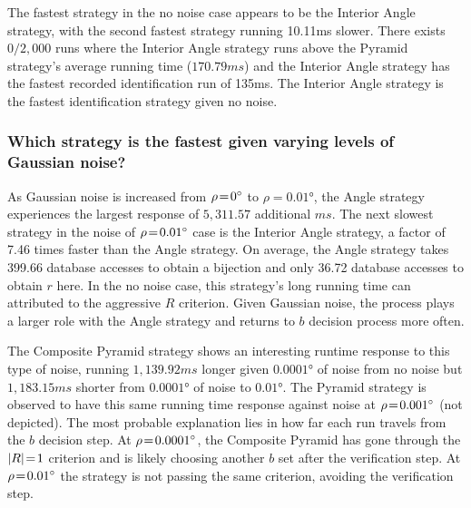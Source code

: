 The fastest strategy in the no noise case appears to be the Interior Angle strategy, with the second fastest strategy
running 10.11\si{ms} slower.
There exists $0 / 2{,}000$ runs where the Interior Angle strategy runs above the Pyramid strategy's average running time
($170.79\si{ms}$) and the Interior Angle strategy has the fastest recorded identification run of 135ms.
The Interior Angle strategy is the fastest identification strategy given no noise.

\subsubsection{Which strategy is the fastest given varying levels of Gaussian noise?}
As Gaussian noise is increased from $\rho\!=\!\ang{0}$ to $\rho=\ang{0.01}$, the Angle strategy experiences the largest
response of $5{,}311.57$ additional $\si{ms}$.
The next slowest strategy in the noise of $\rho\!=\!\ang{0.01}$ case is the Interior Angle strategy, a factor of 7.46 times
faster than the Angle strategy.
On average, the Angle strategy takes 399.66 database accesses to obtain a bijection and only 36.72 database accesses
to obtain $r$ here.
In the no noise case, this strategy's long running time can attributed to the aggressive $R$ criterion.
Given Gaussian noise, the  process plays a larger role with the Angle strategy and returns to $b$
decision process more often.

The Composite Pyramid strategy shows an interesting runtime response to this type of noise, running $1{,}139.92\si{ms}$
longer given $\ang{0.0001}$ of noise from no noise but $1{,}183.15\si{ms}$ shorter from $\ang{0.0001}$ of noise to
$\ang{0.01}$.
The Pyramid strategy is observed to have this same running time response against noise at $\rho\!=\!\ang{0.001}$
(not depicted).
The most probable explanation lies in how far each run travels from the $b$ decision step.
At $\rho\!=\!\ang{0.0001}$, the Composite Pyramid has gone through the $\left| R \right| \!=\! 1$ criterion and is likely choosing
another $b$ set after the verification step.
At $\rho\!=\!\ang{0.01}$ the strategy is not passing the same criterion, avoiding the verification step.


